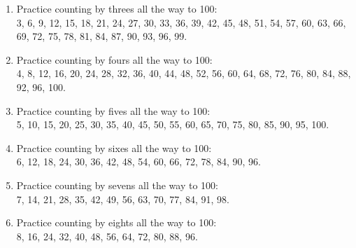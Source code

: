 \documentclass[12pt]{article}
\begin{document}
\begin{enumerate}
\item Practice counting by threes all the way to 100:\\
3, 6, 9, 12, 15, 18, 21, 24, 27, 30, 33, 36, 39, 42, 45, 48, 51, 54, 57, 60, 63, 66, 69, 72, 75, 78, 81, 84, 87, 90, 93, 96, 99.

\begin{center}
\end{center}

\item Practice counting by fours all the way to 100:\\
4, 8, 12, 16, 20, 24, 28, 32, 36, 40, 44, 48, 52, 56, 60, 64, 68, 72, 76, 80, 84, 88, 92, 96, 100.

\begin{center}
\end{center}

\item Practice counting by fives all the way to 100:\\
5, 10, 15, 20, 25, 30, 35, 40, 45, 50, 55, 60, 65, 70, 75, 80, 85, 90, 95, 100.\\

\item Practice counting by sixes all the way to 100:\\
6, 12, 18, 24, 30, 36, 42, 48, 54, 60, 66, 72, 78, 84, 90, 96.\\

\item Practice counting by sevens all the way to 100:\\
7, 14, 21, 28, 35, 42, 49, 56, 63, 70, 77, 84, 91, 98.\\

\item Practice counting by eights all the way to 100:\\
8, 16, 24, 32, 40, 48, 56, 64, 72, 80, 88, 96.\\


\end{enumerate}
\end{document}

